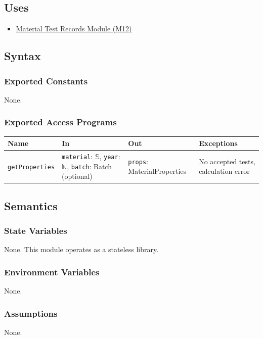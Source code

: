 \documentclass[12pt, titlepage]{article}
\begin{document}
\subsection{Uses}
\begin{itemize}
  \item \hyperref[mTestRecords]{Material Test Records Module (M12)}
\end{itemize}

\subsection{Syntax}

\subsubsection{Exported Constants}
None.

\subsubsection{Exported Access Programs}
\begin{tabularx}{\textwidth}{p{3.2cm} p{5.0cm} p{3.4cm} X}
\toprule
\textbf{Name} & \textbf{In} & \textbf{Out} & \textbf{Exceptions} \\
\midrule
\texttt{getProperties} & \texttt{material}: $\mathbb{S}$, \texttt{year}: $\mathbb{N}$, \texttt{batch}: Batch (optional) & \texttt{props}: MaterialProperties & No accepted tests, calculation error \\
\bottomrule
\end{tabularx}

\subsection{Semantics}

\subsubsection{State Variables}
None. This module operates as a stateless library.

\subsubsection{Environment Variables}
None.

\subsubsection{Assumptions}
None.
\end{document}
